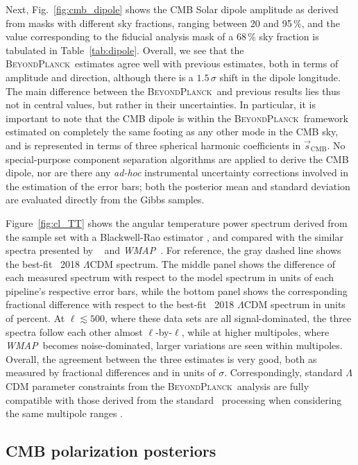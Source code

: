 \documentclass[twocolumn]{aa}
\def\WMAP{\emph{WMAP}}
\newcommand{\s}[0]{\vec{s}}
\newcommand{\BP}{\textsc{BeyondPlanck}}
\begin{document}
Next, Fig.~\ref{fig:cmb_dipole} shows the CMB Solar dipole amplitude
as derived from masks with different sky fractions, ranging between 20
and 95\,\%, and the value corresponding to the fiducial analysis mask
of a 68\,\% sky fraction is tabulated in
Table~\ref{tab:dipole}. Overall, we see that the \BP\ estimates agree
well with previous estimates, both in terms of amplitude and
direction, although there is a $1.5\,\sigma$ shift in the dipole
longitude. The main difference between the \BP\ and previous results
lies thus not in central values, but rather in their uncertainties. In
particular, it is important to note that the CMB dipole is within the
\BP\ framework estimated on completely the same footing as any other
mode in the CMB sky, and is represented in terms of three spherical
harmonic coefficients in $\s_{\mathrm{CMB}}$. No special-purpose
component separation algorithms are applied to derive the CMB dipole,
nor are there any \emph{ad-hoc} instrumental uncertainty corrections
involved in the estimation of the error bars; both the posterior mean
and standard deviation are evaluated directly from the Gibbs samples.

Figure~\ref{fig:cl_TT} shows the angular temperature power spectrum
derived from the sample set with a Blackwell-Rao estimator
\citep{chu2005,bp11}, and compared with the similar spectra presented
by \Planck\ \citep{planck2016-l05} and \WMAP\ \citep{hinshaw2012}. For
reference, the gray dashed line shows the best-fit \Planck\ 2018
$\Lambda$CDM spectrum. The middle panel shows the difference of each
measured spectrum with respect to the model spectrum in units of each
pipeline's respective error bars, while the bottom panel shows the
corresponding fractional difference with respect to the best-fit
\Planck\ 2018 $\Lambda$CDM spectrum in units of percent. At
$\ell\lesssim 500$, where these data sets are all signal-dominated,
the three spectra follow each other almost $\ell$-by-$\ell$, while at
higher multipoles, where \WMAP\ becomes noise-dominated, larger
variations are seen within multipoles. Overall, the agreement between
the three estimates is very good, both as measured by fractional
differences and in units of $\sigma$. Correspondingly, standard
$\Lambda$CDM parameter constraints from the \BP\ analysis are fully
compatible with those derived from the standard \Planck\ processing
when considering the same multipole ranges \citep{bp12}. 


\subsection{CMB polarization posteriors}
\end{document}
